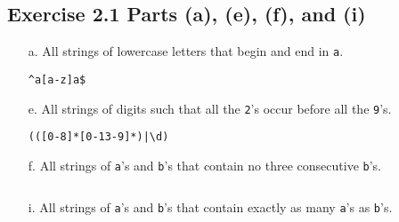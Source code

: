\documentclass[12pt]{article}
\begin{document}
\subsection*{Exercise 2.1 Parts (a), (e), (f), and (i)}
\begin{itemize}
\item[a.] All strings of lowercase letters that begin and end in {\tt a}.
\begin{verbatim}^a[a-z]a$\end{verbatim}
\item[e.] All strings of digits such that all the {\tt 2}'s occur before all the {\tt 9}'s.
\begin{verbatim}(([0-8]*[0-13-9]*)|\d)\end{verbatim}
\item[f.] All strings of {\tt a}'s and {\tt b}'s that contain no three consecutive {\tt b}'s.
\begin{verbatim}\end{verbatim}
\item[i.] All strings of {\tt a}'s and {\tt b}'s that contain exactly as many {\tt a}'s as {\tt b}'s.
\begin{verbatim}\end{verbatim}
\end{itemize}
\end{document}
